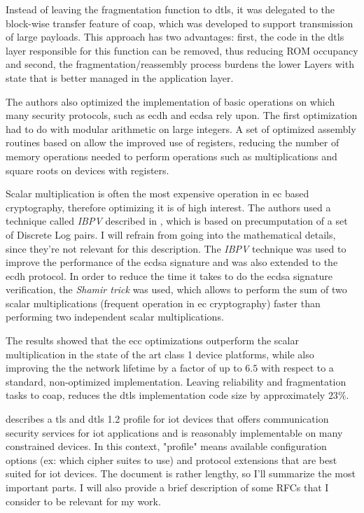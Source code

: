 \documentclass{llncs}
\begin{document}
Instead of leaving the fragmentation function to \gls{dtls}, it was
delegated to the block-wise transfer feature of \gls{coap}\cite{RFC7959}, which was developed
to support transmission of large payloads. This approach has two advantages: first, the code in the \gls{dtls}
layer responsible for this function can be removed, thus reducing ROM occupancy
and second, the fragmentation/reassembly process burdens the lower Layers
with state that is better managed in the application layer.

The authors also optimized the implementation of basic operations on which
many security protocols, such as \gls{ecdh} and \gls{ecdsa} rely upon. The first
optimization had to do with modular arithmetic on large integers. A set of optimized
assembly routines based on \cite{Comparin25:Online} allow the improved use of
registers, reducing the number of memory operations needed to perform
operations such as multiplications and square roots on devices with 
registers.

Scalar multiplication is often the most expensive operation in \gls{ec} based
cryptography, therefore optimizing it is of high interest. The authors used a
technique called \textit{IBPV} described in \cite{LowcostS87:online}, which is based on precumputation
of a set of Discrete Log pairs. I will refrain from going into the mathematical details,
since they're not relevant for this description. The \textit{IBPV} technique was used
to improve the performance of the \gls{ecdsa} signature and was also extended to the
\gls{ecdh} protocol. In order to reduce the time it takes to do the \gls{ecdsa}
signature verification, the \textit{Shamir trick} was used, which allows
to perform the sum of two scalar multiplications (frequent operation in \gls{ec} cryptography)
faster than performing two independent scalar multiplications.

The results showed that the \gls{ecc} optimizations
outperform the scalar multiplication in the state of the art class 1 device platforms,
while also improving the the network lifetime by a factor of up to $6.5$ with
respect to a standard, non-optimized implementation. Leaving reliability and
fragmentation tasks to \gls{coap}, reduces the \gls{dtls} implementation code size
by approximately $23\%$.

\cite{rfc7925} describes a \gls{tls} and \gls{dtls} 1.2
profile for \gls{iot} devices that offers communication security services
for \gls{iot} applications and is reasonably implementable on many constrained devices.
In this context, "profile" means available configuration options (ex: which
cipher suites to use) and protocol extensions that are best suited for \gls{iot} devices.
The document is rather lengthy, so I'll summarize the most important parts. I will
also provide a brief description of some RFCs that I consider to be relevant for
my work.
\end{document}
